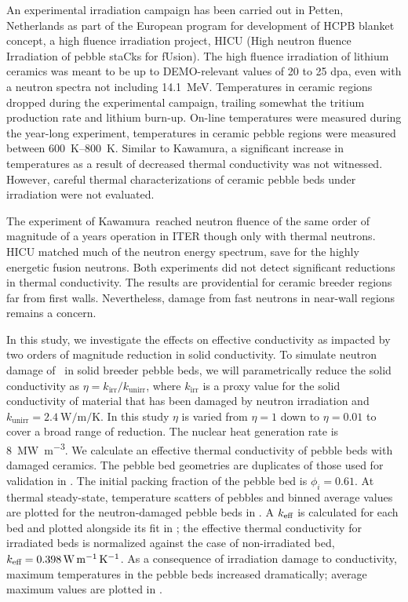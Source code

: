 An experimental irradiation campaign has been carried out in Petten, Netherlands as part of the European program for development of HCPB blanket concept, a high fluence irradiation project, HICU (High neutron fluence Irradiation of pebble staCks for fUsion). The high fluence irradiation of lithium ceramics was meant to be up to DEMO-relevant values of 20 to 25 dpa, even with a neutron spectra not including \SI{14.1}{\mega\electronvolt}.\cite{Hegeman2003,VanTil2012} Temperatures in ceramic regions dropped during the experimental campaign, trailing somewhat the tritium production rate and lithium burn-up. On-line temperatures were measured during the year-long experiment, temperatures in ceramic pebble regions were measured between \SIrange{600}{800}{\kelvin}. Similar to Kawamura\etal, a significant increase in temperatures as a result of decreased thermal conductivity was not witnessed. However, careful thermal characterizations of ceramic pebble beds under irradiation were not evaluated.

The experiment of Kawamura\etal~reached neutron fluence of the same order of magnitude of a years operation in ITER though only with thermal neutrons. HICU matched much of the neutron energy spectrum, save for the highly energetic fusion neutrons. Both experiments did not detect significant reductions in thermal conductivity. The results are providential for ceramic breeder regions far from first walls. Nevertheless, damage from fast neutrons in near-wall regions remains a concern.

In this study, we investigate the effects on effective conductivity as impacted by two orders of magnitude reduction in solid conductivity. To simulate neutron damage of \lit~in solid breeder pebble beds, we will parametrically reduce the solid conductivity as $\eta = k_\text{irr} / k_\text{unirr}$, where $k_\text{irr}$ is a proxy value for the solid conductivity of material that has been damaged by neutron irradiation and $k_\text{unirr} = \SI{2.4}{\watt\per\meter\per\kelvin}$. In this study $\eta$ is varied from $\eta = 1$ down to $\eta = 0.01$ to cover a broad range of reduction. The nuclear heat generation rate is \SI{8}{\mega\watt\per\meter\cubed}. We calculate an effective thermal conductivity of pebble beds with damaged ceramics. The pebble bed geometries are duplicates of those used for validation in . The initial packing fraction of the pebble bed is $\phi_i = 0.61$. At thermal steady-state, temperature scatters of pebbles and binned average values are plotted for the neutron-damaged pebble beds in . A $k_\text{eff}$ is calculated for each bed and plotted alongside its fit in ; the effective thermal conductivity for irradiated beds is normalized against the case of non-irradiated bed, $k_\text{eff} = \SI{0.398}{\watt\per\meter\per\kelvin}$. As a consequence of irradiation damage to conductivity, maximum temperatures in the pebble beds increased dramatically; average maximum values are plotted in .

